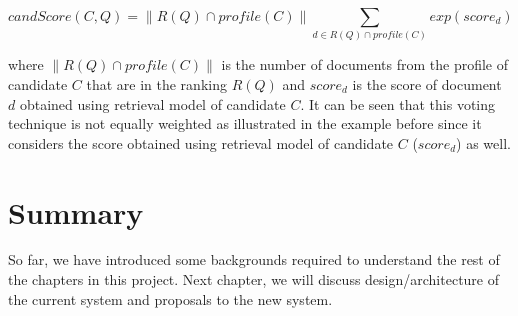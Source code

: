 \begin{table}
\centering
{}
\caption{R(Q)} \label{table:ranking}
\end{table}
\quad
\begin{table}
\centering
{}
\caption{Profiles} \label{table:profiles}
\end{table}

\begin{equation}\label{eq:expCombMNZ}
 candScore(C,Q) = \|R(Q) \cap profile(C)\| \sum_{d \in R(Q) \cap profile(C)} exp(score_d)
\end{equation}

where $\|R(Q) \cap profile(C)\|$ is the number of documents from the profile of candidate $C$ that are in the ranking $R(Q)$ and $score_d$ is the score
of document $d$ obtained using retrieval model of candidate $C$. 
It can be seen that this voting technique is not equally weighted as illustrated in the example before
since it considers the score obtained using retrieval model of candidate $C$ ($score_d$) as well.

\section{Summary}
So far, we have introduced some backgrounds required to understand the rest of the chapters in this project. Next chapter, we will discuss 
design/architecture of the current system and proposals to the new system.